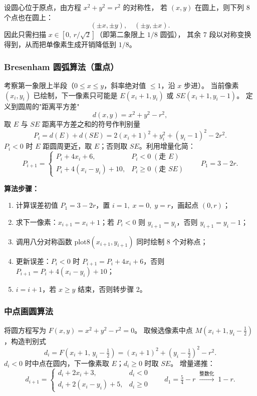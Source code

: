 \documentclass[a4paper,12pt]{ctexart}
\begin{document}
设圆心位于原点，由方程 $x^2+y^2=r^2$ 的对称性，
若 $(x,y)$ 在圆上，则下列 $8$ 个点也在圆上：
\[
    (\pm x,\pm y),\quad (\pm y,\pm x).
\]
因此只需扫描 $x\in[0,\,r/\sqrt{2}]$（即第二象限上 $1/8$ 圆弧），
其余 $7$ 段以对称变换得到，从而把单像素生成开销降低到 $1/8$。

\subsubsection{Bresenham 圆弧算法（重点）}

考察第一象限上半段（$0\le x \le y$，斜率绝对值 $\le 1$，沿 $x$ 步进）。
当前像素 $(x_i,y_i)$ 已绘制，下一像素只可能是 $E(x_i+1,y_i)$ 或 $SE(x_i+1,y_i-1)$。
定义到圆周的"距离平方差"
\[
    d(x,y) = x^2+y^2-r^2,
\]
取 $E$ 与 $SE$ 距离平方差之和的符号作判别量
\[
    P_i = d(E)+d(SE) = 2(x_i+1)^2 + y_i^2 + (y_i-1)^2 - 2r^2.
\]
$P_i<0$ 时 $E$ 距圆周更近，取 $E$；否则取 $SE$。利用增量化简：
\[
    P_{i+1}=
    \begin{cases}
        P_i + 4x_i + 6,                & P_i < 0\;(\text{走 } E) \\
        P_i + 4(x_i-y_i) + 10,         & P_i \ge 0\;(\text{走 } SE)
    \end{cases}
    \qquad
    P_1 = 3 - 2r .
\]

\textbf{算法步骤：}
\begin{enumerate}[leftmargin=2em,itemsep=0.2em]
    \item 计算误差初值 $P_1=3-2r$，置 $i=1,\;x=0,\;y=r$，画起点 $(0,r)$；
    \item 求下一像素：$x_{i+1}=x_i+1$；若 $P_i<0$ 则 $y_{i+1}=y_i$，否则 $y_{i+1}=y_i-1$；
    \item 调用八分对称函数 $\mathrm{plot8}(x_{i+1},y_{i+1})$ 同时绘制 $8$ 个对称点；
    \item 更新误差：$P_i<0$ 时 $P_{i+1}=P_i+4x_i+6$，否则 $P_{i+1}=P_i+4(x_i-y_i)+10$；
    \item $i=i+1$，若 $x \ge y$ 结束，否则转步骤 2。
\end{enumerate}

\subsubsection{中点画圆算法}

将圆方程写为 $F(x,y)=x^2+y^2-r^2=0$。
取候选像素中点 $M(x_i+1,y_i-\tfrac{1}{2})$，构造判别式
\[
    d_i = F(x_i+1,\,y_i-\tfrac{1}{2}) = (x_i+1)^2+(y_i-\tfrac{1}{2})^2 - r^2.
\]
$d_i<0$ 时中点在圆内，下一像素取 $E$；$d_i\ge 0$ 时取 $SE$。
增量递推：
\[
    d_{i+1}=
    \begin{cases}
        d_i + 2x_i+3,            & d_i<0 \\
        d_i + 2(x_i-y_i)+5,      & d_i\ge 0
    \end{cases}
    \qquad
    d_1 = \tfrac{5}{4}-r \;\xrightarrow{\text{整数化}}\; 1-r .
\]
\end{document}

